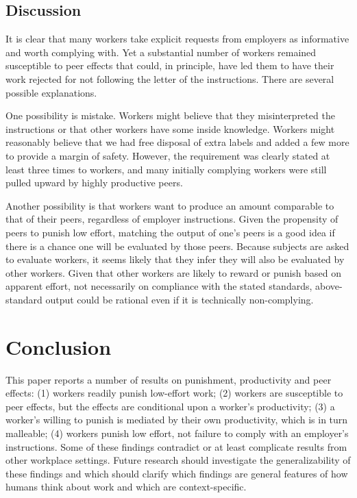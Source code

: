 \documentclass[12pt]{article}
\begin{document}
\subsection{Discussion} 
It is clear that many workers take explicit requests from employers as
informative and worth complying with. Yet a substantial number of
workers remained susceptible to peer effects that could, in principle,
have led them to have their work rejected for not following the letter
of the instructions. There are several possible explanations.

One possibility is mistake. Workers might believe that they
misinterpreted the instructions or that other workers have some inside
knowledge. Workers might reasonably believe that we had free disposal
of extra labels and added a few more to provide a margin of safety.
However, the requirement was clearly stated at least three times to
workers, and many initially complying workers were still pulled upward
by highly productive peers.

Another possibility is that workers want to produce an amount
comparable to that of their peers, regardless of employer
instructions. Given the propensity of peers to punish low effort,
matching the output of one's peers is a good idea if there is a chance
one will be evaluated by those peers. Because subjects are asked to
evaluate workers, it seems likely that they infer they will also be
evaluated by other workers. Given that other workers are likely to
reward or punish based on apparent effort, not necessarily on
compliance with the stated standards, above-standard output could be
rational even if it is technically non-complying.

\section{Conclusion} 
This paper reports a number of results on punishment, productivity and
peer effects: (1) workers readily punish low-effort work; (2) workers
are susceptible to peer effects, but the effects are conditional upon
a worker's productivity; (3) a worker's willing to punish is mediated
by their own productivity, which is in turn malleable; (4) workers
punish low effort, not failure to comply with an employer's
instructions. Some of these findings contradict or at least complicate
results from other workplace settings. Future research should
investigate the generalizability of these findings and which should
clarify which findings are general features of how humans think about
work and which are context-specific.
\end{document}
